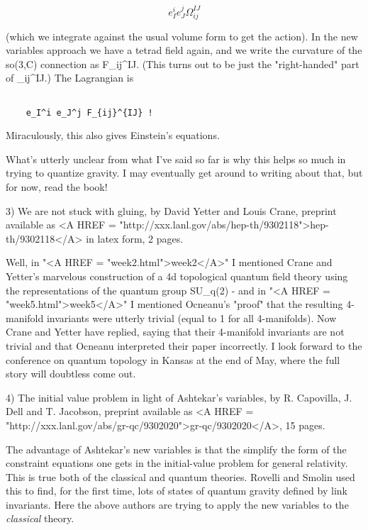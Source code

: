 $$

       e_I^i e_J^j \Omega _{ij}^{IJ}
$$
    

(which we integrate against the usual volume form to get the action).  
In the new variables approach we have a tetrad field again, and we write
the curvature of the so(3,C) connection as F_{ij}^{IJ}.  (This turns out
to be just the "right-handed" part of \Omega _{ij}^{IJ}.)  The Lagrangian
is


\begin{verbatim}

	e_I^i e_J^j F_{ij}^{IJ} !
\end{verbatim}
    

Miraculously, this also gives Einstein's equations.  

What's utterly unclear from what I've said so far is why this helps so
much in trying to quantize gravity.  I may eventually get around to
writing about that, but for now, read the book!

3)  We are not stuck with gluing, by David Yetter and Louis Crane, preprint
available as <A HREF = "http://xxx.lanl.gov/abs/hep-th/9302118">hep-th/9302118</A> in latex form, 2 pages.

Well, in "<A HREF = "week2.html">week2</A>" I mentioned Crane and Yetter's marvelous construction of
a 4d topological quantum field theory using the representations of
the quantum group SU_q(2) - and in "<A HREF = "week5.html">week5</A>" I mentioned Ocneanu's "proof"
that the resulting 4-manifold invariants were utterly trivial (equal to
1 for all 4-manifolds).  Now Crane and Yetter have replied, saying that
their 4-manifold invariants are not trivial and that Ocneanu interpreted
their paper incorrectly.  I look forward to the conference on quantum
topology in Kansas at the end of May, where the full story will
doubtless come out.

4)  The initial value problem in light of Ashtekar's variables, by 
R. Capovilla, J. Dell and T. Jacobson, preprint available as
<A HREF = "http://xxx.lanl.gov/abs/gr-qc/9302020">gr-qc/9302020</A>, 15 pages.

The advantage of Ashtekar's new variables is that the simplify the form
of the constraint equations one gets in the initial-value problem for
general relativity.  This is true both of the classical and quantum
theories.  Rovelli and Smolin used this to find, for the first time,
lots of states of quantum gravity defined by link invariants.  Here the
above authors are trying to apply the new variables to the \emph{classical}
theory.  

